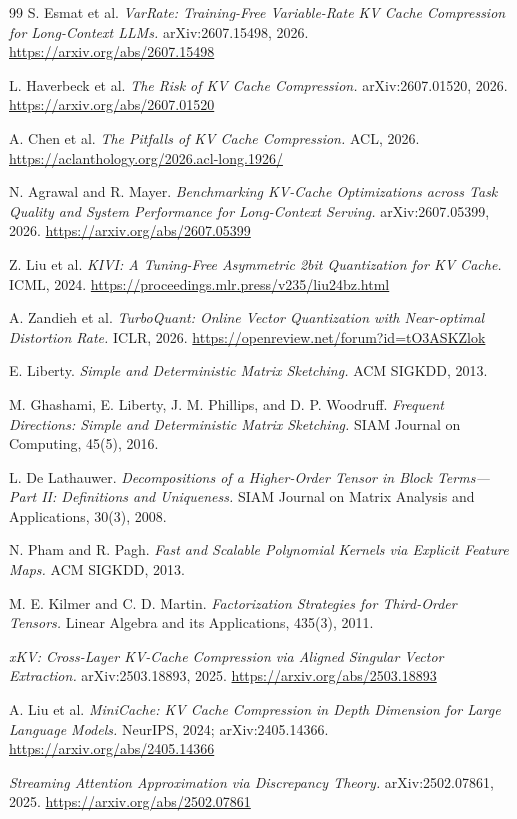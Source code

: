 \documentclass[10pt]{article}
\begin{document}
\begin{thebibliography}{99}
 S. Esmat et al. \emph{VarRate: Training-Free Variable-Rate KV Cache Compression for
Long-Context LLMs.} arXiv:2607.15498, 2026. \url{https://arxiv.org/abs/2607.15498}

 L. Haverbeck et al. \emph{The Risk of KV Cache Compression.}
arXiv:2607.01520, 2026. \url{https://arxiv.org/abs/2607.01520}

 A. Chen et al. \emph{The Pitfalls of KV Cache Compression.} ACL, 2026.
\url{https://aclanthology.org/2026.acl-long.1926/}

 N. Agrawal and R. Mayer. \emph{Benchmarking KV-Cache Optimizations across Task
Quality and System Performance for Long-Context Serving.} arXiv:2607.05399, 2026.
\url{https://arxiv.org/abs/2607.05399}

 Z. Liu et al. \emph{KIVI: A Tuning-Free Asymmetric 2bit Quantization for KV Cache.}
ICML, 2024. \url{https://proceedings.mlr.press/v235/liu24bz.html}

 A. Zandieh et al. \emph{TurboQuant: Online Vector Quantization with
Near-optimal Distortion Rate.} ICLR, 2026.
\url{https://openreview.net/forum?id=tO3ASKZlok}

 E. Liberty. \emph{Simple and Deterministic Matrix Sketching.} ACM SIGKDD,
2013.

 M. Ghashami, E. Liberty, J. M. Phillips, and D. P. Woodruff.
\emph{Frequent Directions: Simple and Deterministic Matrix Sketching.} SIAM Journal on Computing,
45(5), 2016.

 L. De Lathauwer. \emph{Decompositions of a Higher-Order Tensor in Block
Terms---Part II: Definitions and Uniqueness.} SIAM Journal on Matrix Analysis and Applications,
30(3), 2008.

 N. Pham and R. Pagh. \emph{Fast and Scalable Polynomial Kernels via
Explicit Feature Maps.} ACM SIGKDD, 2013.

 M. E. Kilmer and C. D. Martin. \emph{Factorization Strategies for Third-Order
Tensors.} Linear Algebra and its Applications, 435(3), 2011.

 \emph{xKV: Cross-Layer KV-Cache Compression via Aligned Singular Vector Extraction.}
arXiv:2503.18893, 2025. \url{https://arxiv.org/abs/2503.18893}

 A. Liu et al. \emph{MiniCache: KV Cache Compression in Depth Dimension for
Large Language Models.} NeurIPS, 2024; arXiv:2405.14366. \url{https://arxiv.org/abs/2405.14366}

 \emph{Streaming Attention Approximation via Discrepancy Theory.}
arXiv:2502.07861, 2025. \url{https://arxiv.org/abs/2502.07861}

\end{thebibliography}
\end{document}
